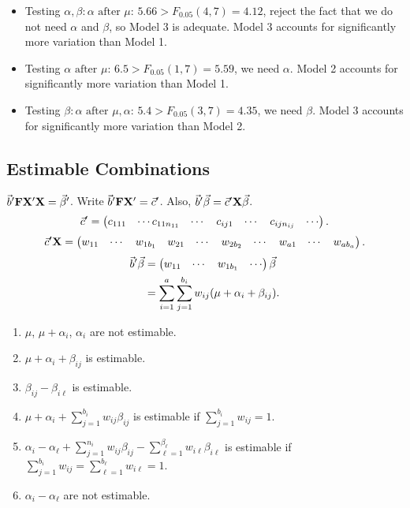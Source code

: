 \begin{Example}{}{}
\begin{itemize}
        \item Testing $ \alpha,\beta:\alpha\text{ after }\mu $: $ 5.66>F_{0.05}(4,7)=4.12 $, reject the fact
              that we do not need $ \alpha $ and $ \beta $, so Model 3 is adequate. Model 3
              accounts for significantly more variation than Model 1.
        \item Testing $ \alpha\text{ after }\mu $: $ 6.5>F_{0.05}(1,7)=5.59 $, we need $ \alpha $.
              Model 2 accounts for significantly more variation than Model 1.
        \item Testing $ \beta:\alpha\text{ after }\mu,\alpha $: $ 5.4>F_{0.05}(3,7)=4.35 $, we need $ \beta $.
              Model 3 accounts for significantly more variation than Model 2.
    \end{itemize}
\end{Example}
\subsection*{Estimable Combinations}
$ \vec{b}'\mathbf{F}\mathbf{X}'\mathbf{X}=\vec{\beta}' $.
Write $ \vec{b}'\mathbf{F}\mathbf{X}'=\vec{c}' $.
Also, $ \vec{b}'\vec{\beta}=\vec{c}'\mathbf{X}\vec{\beta} $.
\[ \vec{c}'=\begin{pmatrix}
        c_{111} & \cdots c_{11n_{11}} & \cdots & c_{ij1} & \cdots & c_{ijn_{ij}} & \cdots
    \end{pmatrix}. \]
\[ \vec{c}'\mathbf{X}=\begin{pmatrix}
        w_{11} & \cdots & w_{1b_1} & w_{21} & \cdots & w_{2b_2} & \cdots & w_{a1} & \cdots & w_{ab_a}
    \end{pmatrix}. \]
\begin{align*}
    \vec{b}'\vec{\beta}
     & =\begin{pmatrix}
            w_{11} & \cdots & w_{1b_1} & \cdots
        \end{pmatrix}\vec{\beta}                            \\
     & =\sum_{i=1}^{a}\sum_{j=1}^{b_i}w_{ij}(\mu+\alpha_i+\beta_{ij}).
\end{align*}
\begin{enumerate}[(1)]
    \item $ \mu $, $ \mu+\alpha_i $, $ \alpha_i $ are not estimable.
    \item $ \mu+\alpha_i+\beta_{ij} $ is estimable.
    \item $ \beta_{ij}-\beta_{i\ell} $ is estimable.
    \item $ \mu+\alpha_i+\sum_{j=1}^{b_i}w_{ij}\beta_{ij} $ is estimable if $ \sum_{j=1}^{b_i}w_{ij}=1 $.
    \item $ \alpha_i-\alpha_\ell+\sum_{j=1}^{n_i}w_{ij}\beta_{ij}-\sum_{\ell=1}^{\beta_\ell}w_{i\ell}\beta_{i\ell} $
          is estimable if $ \sum_{j=1}^{b_i}w_{ij}=\sum_{\ell=1}^{b_\ell}w_{i\ell}=1 $.
    \item $ \alpha_i-\alpha_\ell $ are not estimable.
\end{enumerate}

